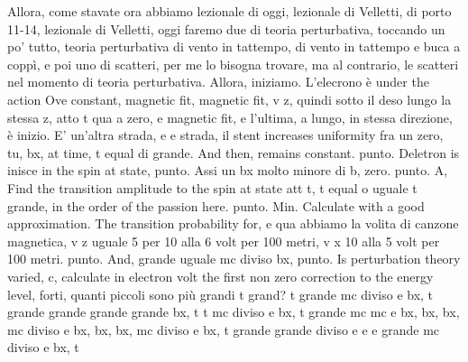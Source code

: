 \begin{soluzione}
   Allora, come stavate ora abbiamo lezionale di oggi, lezionale di Velletti, di porto 11-14, lezionale di Velletti, oggi faremo due di teoria perturbativa, toccando un po' tutto, teoria perturbativa di vento in tattempo, di vento in tattempo e buca a coppì, e poi uno di scatteri, per me lo bisogna trovare, ma al contrario, le scatteri nel momento di teoria perturbativa. Allora, iniziamo. L'elecrono è under the action Ove constant, magnetic fit, magnetic fit, v z, quindi sotto il deso lungo la stessa z, atto t qua a zero, e magnetic fit, e l'ultima, a lungo, in stessa direzione, è inizio. E' un'altra strada, e e strada, il stent increases uniformity fra un zero, tu, bx, at time, t equal di grande. And then, remains constant. punto. Deletron is inisce in the spin at state, punto. Assi un bx molto minore di b, zero. punto. A, Find the transition amplitude to the spin at state att t, t equal o uguale t grande, in the order of the passion here. punto. Min. Calculate with a good approximation. The transition probability for, e qua abbiamo la volita di canzone magnetica, v z uguale 5 per 10 alla 6 volt per 100 metri, v x 10 alla 5 volt per 100 metri. punto. And, grande uguale mc diviso bx, punto. Is perturbation theory varied, c, calculate in electron volt the first non zero correction to the energy level, forti, quanti piccoli sono più grandi t grand? t grande mc diviso e bx, t grande grande grande grande bx, t t mc diviso e bx, t grande mc mc e bx, bx, bx, mc diviso e bx, bx, bx, mc diviso e bx, t grande grande diviso e e e grande mc diviso e bx, t 
   

\end{soluzione}
